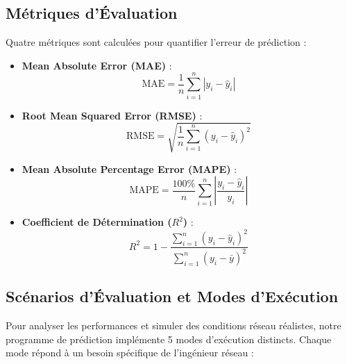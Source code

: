 \documentclass[11pt,a4paper]{article}
\begin{document}
\subsection{Métriques d'Évaluation}
Quatre métriques sont calculées pour quantifier l'erreur de prédiction :
\begin{itemize}
    \item \textbf{Mean Absolute Error (MAE)} :
    \begin{equation}
        \text{MAE} = \frac{1}{n} \sum_{i=1}^{n} |y_i - \hat{y}_i|
    \end{equation}
    \item \textbf{Root Mean Squared Error (RMSE)} :
    \begin{equation}
        \text{RMSE} = \sqrt{\frac{1}{n} \sum_{i=1}^{n} (y_i - \hat{y}_i)^2}
    \end{equation}
    \item \textbf{Mean Absolute Percentage Error (MAPE)} :
    \begin{equation}
        \text{MAPE} = \frac{100\%}{n} \sum_{i=1}^{n} \left| \frac{y_i - \hat{y}_i}{y_i} \right|
    \end{equation}
    \item \textbf{Coefficient de Détermination ($R^2$)} :
    \begin{equation}
        R^2 = 1 - \frac{\sum_{i=1}^{n} (y_i - \hat{y}_i)^2}{\sum_{i=1}^{n} (y_i - \bar{y})^2}
    \end{equation}
\end{itemize}

\subsection{Scénarios d'Évaluation et Modes d'Exécution}
Pour analyser les performances et simuler des conditions réseau réalistes, notre programme de prédiction implémente 5 modes d'exécution distincts. Chaque mode répond à un besoin spécifique de l'ingénieur réseau :
\end{document}
